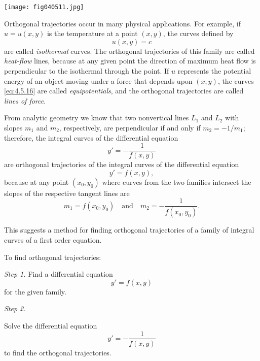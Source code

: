 \documentclass{ximera}
\begin{document}
\begin{image}
  \texttt{[image: fig040511.jpg]}
\end{image}
 
Orthogonal trajectories occur in many physical applications.
For example, if $u=u(x,y)$ is the temperature at a point $(x,y)$,  the
curves defined by
\begin{equation} \label{eq:4.5.16}
u(x,y)=c
\end{equation}
are called \textit{isothermal} curves. The orthogonal trajectories of
this family are called \textit{heat-flow} lines, because at any given
point the direction of maximum heat flow is perpendicular to the
isothermal through the point. If $u$ represents the potential energy
of an object moving under a force that depends upon $(x,y)$,  the
curves \eqref{eq:4.5.16} are called \textit{equipotentials}, and the
orthogonal trajectories are called \textit{lines of force}.
 
From analytic geometry we know that two nonvertical lines $L_1$ and
$L_2$ with slopes $m_1$ and $m_2$, respectively, are perpendicular if
and only if $m_2=-1/m_1$;  therefore, the integral curves of the
differential equation
$$
y'=-\frac{1}{f(x,y)}
$$
are orthogonal trajectories of the integral curves of the differential
equation
$$
y'=f(x,y),
$$
because at any point $(x_0,y_0)$ where curves from the two families
intersect the slopes of the respective tangent lines are
$$
m_1=f(x_0,y_0)\quad\mbox{and}\quad m_2=-\frac{1}{f(x_0,y_0)}.
$$
 
This suggests a  method for finding orthogonal trajectories
of a family of integral curves of a first order equation.
 
\begin{procedure}\label{proc:orthTraj}
To find orthogonal trajectories:

\textit{Step 1.}
Find a differential equation
$$
y'=f(x,y)
$$
 for the given family.
 
\textit{Step 2.}
 
Solve the differential equation
$$
y'=-\frac{1}{f(x,y)}
$$
to find the orthogonal trajectories.

\end{procedure}
 
\end{document}
